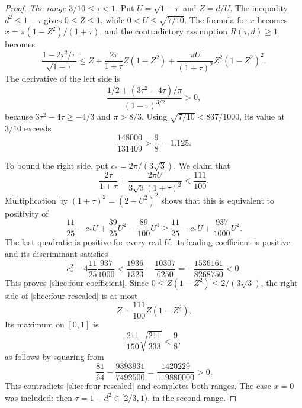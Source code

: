 \begin{proof}
\smallskip
\noindent\emph{The range $3/10\le\tau<1$.}
Put $U=\sqrt{1-\tau}$ and $Z=d/U$.  The inequality
$d^2\le1-\tau$ gives $0\le Z\le1$, while
$0<U\le\sqrt{7/10}$.  The formula for $x$ becomes
$x=\pi(1-Z^2)/(1+\tau)$, and
the contradictory assumption $R(\tau,d)\ge1$ becomes
\begin{equation}\label{slice:four-rescaled}
 \frac{1-2\tau^2/\pi}{\sqrt{1-\tau}}
 \le Z+\frac{2\tau}{1+\tau}Z(1-Z^2)
       +\frac{\pi U}{(1+\tau)^2}Z^2(1-Z^2)^2.
\end{equation}
The derivative of the left side is
\[
 \frac{1/2+(3\tau^2-4\tau)/\pi}{(1-\tau)^{3/2}}>0,
\]
because $3\tau^2-4\tau\ge-4/3$ and $\pi>8/3$.
Using $\sqrt{7/10}<837/1000$, its value at $3/10$ exceeds
\[
 \frac{148000}{131409}>
 \frac98=1.125.
\]

To bound the right side, put $c_*=2\pi/(3\sqrt3)$.  We claim that
\begin{equation}\label{slice:four-coefficient}
 \frac{2\tau}{1+\tau}
 +\frac{2\pi U}{3\sqrt3(1+\tau)^2}<\frac{111}{100}.
\end{equation}
Multiplication by $(1+\tau)^2=(2-U^2)^2$ shows that this is equivalent
to positivity of
\[
 \frac{11}{25}-c_*U+\frac{39}{25}U^2-\frac{89}{100}U^4
 \ge\frac{11}{25}-c_*U+\frac{937}{1000}U^2.
\]
The last quadratic is positive for every real $U$: its leading
coefficient is positive and its discriminant satisfies
\[
 c_*^2-4\frac{11}{25}\frac{937}{1000}
 <\frac{1936}{1323}-\frac{10307}{6250}
 =-\frac{1536161}{8268750}<0.
\]
This proves \eqref{slice:four-coefficient}.  Since
$0\le Z(1-Z^2)\le2/(3\sqrt3)$, the right side of
\eqref{slice:four-rescaled} is at most
\[
 Z+\frac{111}{100}Z(1-Z^2).
\]
Its maximum on $[0,1]$ is
\[
 \frac{211}{150}\sqrt{\frac{211}{333}}<\frac98,
\]
as follows by squaring from
\[
 \frac{81}{64}-\frac{9393931}{7492500}
 =\frac{1420229}{119880000}>0.
\]
This contradicts \eqref{slice:four-rescaled} and completes both ranges.
The case $x=0$ was included: then
$\tau=1-d^2\in[2/3,1)$, in the second range.
\end{proof}

